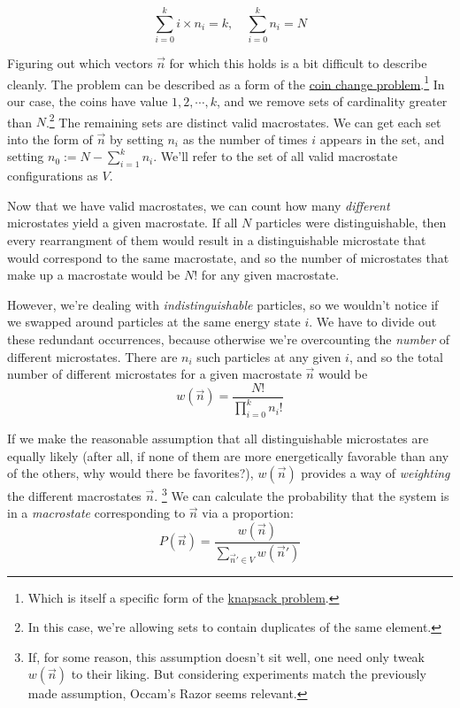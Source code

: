 \documentclass[letterpaper,12pt]{report}
\begin{document}
\[\sum_{i=0}^{k} i \times n_i = k, \quad \sum_{i=0}^{k} n_i = N\]

Figuring out which vectors \(\vec{n}\) for which this holds is a bit difficult to describe
cleanly. The problem can be described as a form of the
\href{https://www.geeksforgeeks.org/dynamic-programming-set-7-coin-change/}
{coin change problem}.\footnote{
  Which is itself a specific form of the
  \href{https://en.wikipedia.org/wiki/Knapsack_problem}{knapsack problem}.
}
In our case, the coins have value \(1, 2, \cdots, k\), and we remove sets of cardinality
greater than \(N\).\footnote{
  In this case, we're allowing sets to contain duplicates of the same element.
 }
The remaining sets are distinct valid macrostates. We can get each
set into the form of \(\vec{n}\) by setting \(n_i\) as the number of times \(i\) appears in
the set, and setting \(n_0 := N - \sum_{i=1}^{k} n_i\).
We'll refer to the set of all valid macrostate configurations as \(V\).


Now that we have valid macrostates, we can count how many \emph{different} 
microstates yield a given
macrostate. If all \(N\) particles were distinguishable, then every rearrangment of them
would result in a distinguishable microstate that would correspond to the same macrostate,
and so the number of microstates that make up a macrostate would be \(N!\) for any given
macrostate.

However, we're dealing with \emph{indistinguishable} particles, so we wouldn't notice if
we swapped around particles at the same energy state \(i\). We have to divide out these
redundant occurrences, because otherwise we're overcounting the \emph{number} of different
microstates.
There are \(n_i\) such particles at any given \(i\), and so the total number of different
microstates for a given macrostate \(\vec{n}\) would be
\[w\left(\vec{n}\right) = \frac{N!}{\prod_{i=0}^{k}n_i!}\]

If we make the reasonable assumption that all distinguishable microstates are equally likely
(after all, if none of them are more energetically favorable than any of the others, 
why would there be favorites?),
\(w(\vec{n})\) provides a way of \emph{weighting} the different macrostates 
\(\vec{n}\).
\footnote{
  If, for some reason, this assumption doesn't sit well, 
  one need only tweak \(w(\vec{n})\) to their liking.
  But considering experiments match the previously made assumption, Occam's
  Razor seems relevant.
}
We can calculate the probability that the system is in a \emph{macrostate} corresponding
to \(\vec{n}\) via a proportion:
\[P(\vec{n}) = \frac{w(\vec{n})}{ \sum_{\vec{n}' \in V} w({\vec{n}'}) } \]
\end{document}
